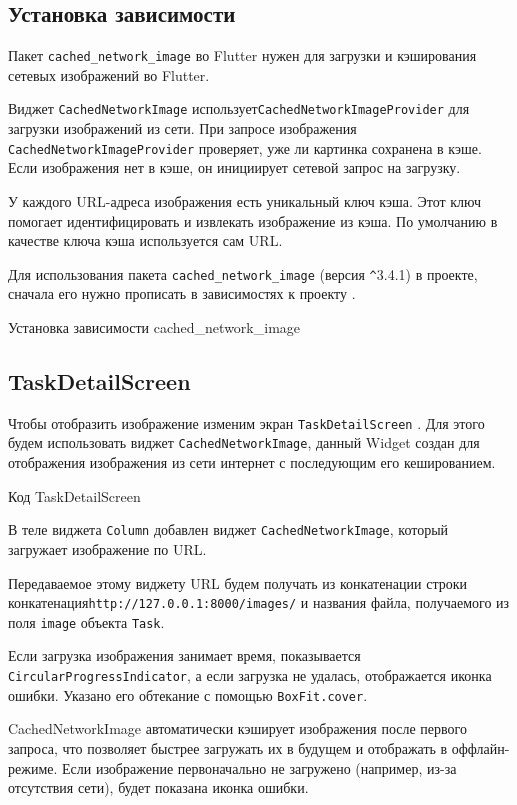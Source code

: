 

\subsection{Установка зависимости}

Пакет \texttt{cached\_network\_image} во Flutter нужен
для загрузки и кэширования сетевых изображений во Flutter.

Виджет \texttt{CachedNetworkImage}
использует\texttt{CachedNetworkImageProvider} 
для загрузки изображений из сети.
При запросе изображения \texttt{CachedNetworkImageProvider} проверяет,
уже ли картинка сохранена в кэше.
Если изображения нет в кэше, он инициирует сетевой запрос на загрузку.

У каждого URL-адреса изображения есть уникальный ключ кэша.
Этот ключ помогает идентифицировать и извлекать изображение из кэша.
По умолчанию в качестве ключа кэша используется сам URL.

Для использования пакета \texttt{cached\_network\_image}
(версия \verb|^|3.4.1) в проекте, сначала его нужно прописать
в зависимостях к проекту .

\begin{image}
	\caption{Установка зависимости cached\_network\_image}
	\label{fig:cached:network:image}
\end{image}

\subsection{TaskDetailScreen}

Чтобы отобразить изображение изменим
экран \texttt{TaskDetailScreen} .
Для этого будем использовать виджет \texttt{CachedNetworkImage},
данный Widget создан для отображения изображения
из сети интернет с последующим его кешированием.

\begin{image}
	\caption{Код TaskDetailScreen}
	\label{fig:screen:detail}
\end{image}

В теле виджета \texttt{Column} добавлен виджет \texttt{CachedNetworkImage},
который загружает изображение по URL.\par
Передаваемое этому виджету URL будем получать из конкатенации
строки конкатенация\texttt{http://127.0.0.1:8000/images/} и
названия файла, получаемого из поля \texttt{image} объекта \texttt{Task}.\par
Если загрузка изображения занимает время,
показывается \texttt{CircularProgressIndicator},
а если загрузка не удалась, отображается иконка ошибки.
Указано его обтекание с помощью \texttt{BoxFit.cover}.\par
CachedNetworkImage автоматически кэширует изображения после первого запроса,
что позволяет быстрее загружать их в будущем и отображать в оффлайн-режиме.
Если изображение первоначально не загружено (например, из-за отсутствия сети),
будет показана иконка ошибки.

